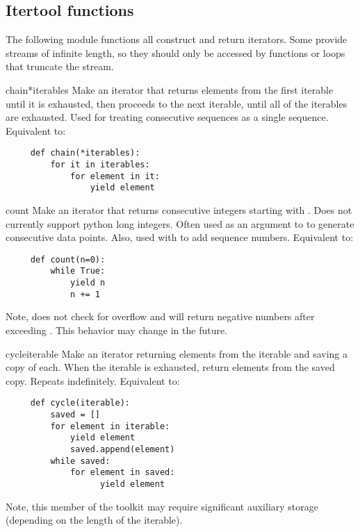 \subsection{Itertool functions \label{itertools-functions}}

The following module functions all construct and return iterators.
Some provide streams of infinite length, so they should only be accessed
by functions or loops that truncate the stream.

\begin{funcdesc}{chain}{*iterables}
  Make an iterator that returns elements from the first iterable until
  it is exhausted, then proceeds to the next iterable, until all of the
  iterables are exhausted.  Used for treating consecutive sequences as
  a single sequence.  Equivalent to:

  \begin{verbatim}
     def chain(*iterables):
         for it in iterables:
             for element in it:
                 yield element
  \end{verbatim}
\end{funcdesc}

\begin{funcdesc}{count}{}
  Make an iterator that returns consecutive integers starting with .
  Does not currently support python long integers.  Often used as an
  argument to  to generate consecutive data points.
  Also, used with  to add sequence numbers.  Equivalent to:

  \begin{verbatim}
     def count(n=0):
         while True:
             yield n
             n += 1
  \end{verbatim}

  Note,  does not check for overflow and will return
  negative numbers after exceeding .  This behavior
  may change in the future.
\end{funcdesc}

\begin{funcdesc}{cycle}{iterable}
  Make an iterator returning elements from the iterable and saving a
  copy of each.  When the iterable is exhausted, return elements from
  the saved copy.  Repeats indefinitely.  Equivalent to:

  \begin{verbatim}
     def cycle(iterable):
         saved = []
         for element in iterable:
             yield element
             saved.append(element)
         while saved:
             for element in saved:
                   yield element
  \end{verbatim}

  Note, this member of the toolkit may require significant
  auxiliary storage (depending on the length of the iterable).
\end{funcdesc}

